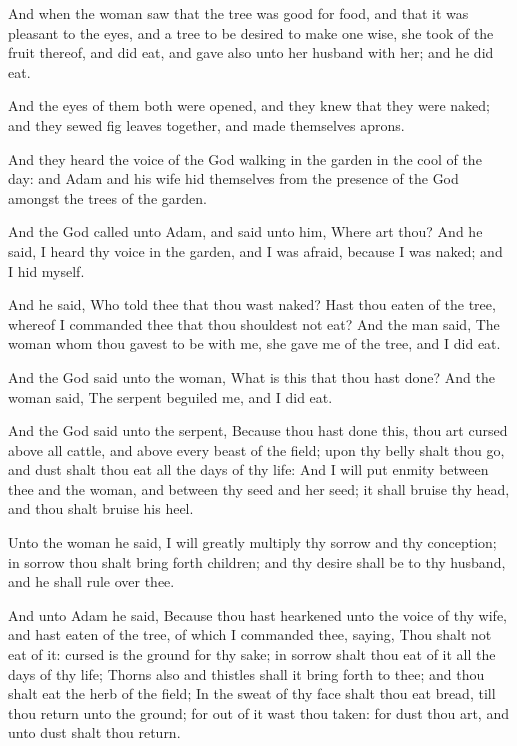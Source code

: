 \verse And when the woman saw that the tree was good for food, and that
it was pleasant to the eyes, and a tree to be desired to make one
wise, she took of the fruit thereof, and did eat, and gave also unto
her husband with her; and he did eat.

\verse And the eyes of them both were opened, and they knew that they
were naked; and they sewed fig leaves together, and made themselves
aprons.

\verse And they heard the voice of the \LORD God walking in the garden in
the cool of the day: and Adam and his wife hid themselves from the
presence of the \LORD God amongst the trees of the garden.

\verse And the \LORD God called unto Adam, and said unto him, Where art
thou?  \verse And he said, I heard thy voice in the garden, and I was
afraid, because I was naked; and I hid myself.

\verse And he said, Who told thee that thou wast naked? Hast thou eaten
of the tree, whereof I commanded thee that thou shouldest not eat?
\verse And the man said, The woman whom thou gavest to be with me, she
gave me of the tree, and I did eat.

\verse And the \LORD God said unto the woman, What is this that thou hast
done? And the woman said, The serpent beguiled me, and I did eat.

\verse And the \LORD God said unto the serpent, Because thou hast done
this, thou art cursed above all cattle, and above every beast of the
field; upon thy belly shalt thou go, and dust shalt thou eat all the
days of thy life: \verse And I will put enmity between thee and the
woman, and between thy seed and her seed; it shall bruise thy head,
and thou shalt bruise his heel.

\verse Unto the woman he said, I will greatly multiply thy sorrow and
thy conception; in sorrow thou shalt bring forth children; and thy
desire shall be to thy husband, and he shall rule over thee.

\verse And unto Adam he said, Because thou hast hearkened unto the voice
of thy wife, and hast eaten of the tree, of which I commanded thee,
saying, Thou shalt not eat of it: cursed is the ground for thy sake;
in sorrow shalt thou eat of it all the days of thy life; \verse Thorns
also and thistles shall it bring forth to thee; and thou shalt eat the
herb of the field; \verse In the sweat of thy face shalt thou eat bread,
till thou return unto the ground; for out of it wast thou taken: for
dust thou art, and unto dust shalt thou return.

